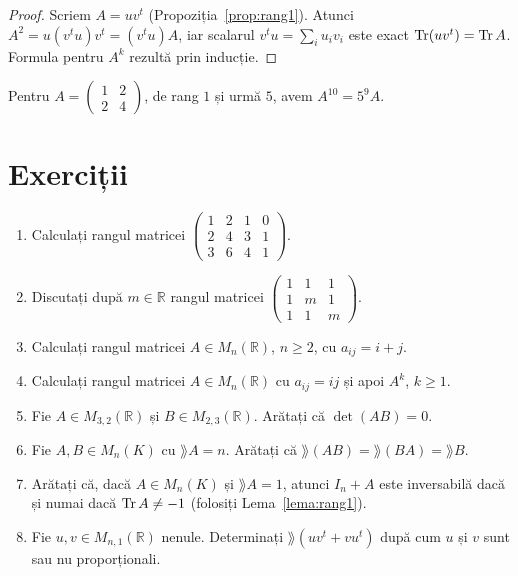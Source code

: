 \begin{proof}
Scriem $A=uv^t$ (Propoziția~\ref{prop:rang1}). Atunci $A^2=u(v^tu)v^t=(v^tu)A$, iar scalarul $v^tu=\sum_iu_iv_i$ este exact $\operatorname{Tr}(uv^t)=\operatorname{Tr} A$. Formula pentru $A^k$ rezultă prin inducție.
\end{proof}

\begin{exemplu}
Pentru $A=\begin{pmatrix}1&2\\2&4\end{pmatrix}$, de rang $1$ și urmă $5$, avem $A^{10}=5^9A$.
\end{exemplu}

\section{Exerciții}

\begin{enumerate}[label=\textbf{\arabic*.},leftmargin=*]
\item Calculați rangul matricei $\begin{pmatrix}1&2&1&0\\2&4&3&1\\3&6&4&1\end{pmatrix}$.
\item Discutați după $m\in\mathbb{R}$ rangul matricei $\begin{pmatrix}1&1&1\\1&m&1\\1&1&m\end{pmatrix}$.
\item Calculați rangul matricei $A\in M_n(\mathbb{R})$, $n\ge2$, cu $a_{ij}=i+j$.
\item Calculați rangul matricei $A\in M_n(\mathbb{R})$ cu $a_{ij}=ij$ și apoi $A^k$, $k\ge1$.
\item Fie $A\in M_{3,2}(\mathbb{R})$ și $B\in M_{2,3}(\mathbb{R})$. Arătați că $\det(AB)=0$.
\item Fie $A,B\in M_n(K)$ cu $\rang A=n$. Arătați că $\rang(AB)=\rang(BA)=\rang B$.
\item Arătați că, dacă $A\in M_n(K)$ și $\rang A=1$, atunci $I_n+A$ este inversabilă dacă și numai dacă $\operatorname{Tr} A\neq-1$ (folosiți Lema~\ref{lema:rang1}).
\item Fie $u,v\in M_{n,1}(\mathbb{R})$ nenule. Determinați $\rang(uv^t+vu^t)$ după cum $u$ și $v$ sunt sau nu proporționali.
\end{enumerate}

